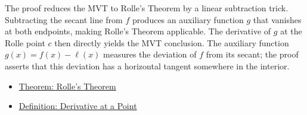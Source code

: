 \begin{remark*}
The proof reduces the MVT to Rolle's Theorem by a linear subtraction trick. Subtracting the secant line from $f$ produces an auxiliary function $g$ that vanishes at both endpoints, making Rolle's Theorem applicable. The derivative of $g$ at the Rolle point $c$ then directly yields the MVT conclusion. The auxiliary function $g(x) = f(x) - \ell(x)$ measures the deviation of $f$ from its secant; the proof asserts that this deviation has a horizontal tangent somewhere in the interior.
\end{remark*}

\begin{dependencies}
\begin{itemize}
  \item \hyperref[thm:rolles-theorem]{Theorem: Rolle's Theorem}
  \item \hyperref[def:derivative-at-a-point]{Definition: Derivative at a Point}
\end{itemize}
\end{dependencies}

\clearpage
